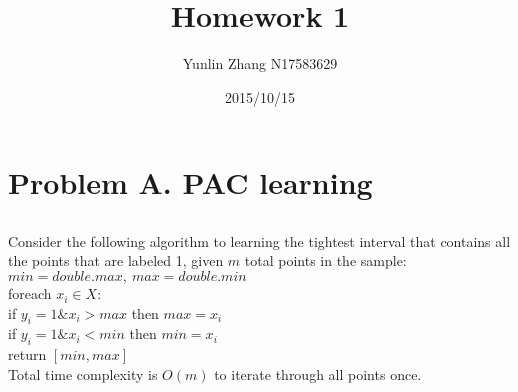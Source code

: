 \documentclass[11pt, oneside]{article}   	%
\title{Homework 1}
\author{Yunlin Zhang N17583629}
\date{2015/10/15}							%
\begin{document}
\maketitle
\section{Problem A. PAC learning}
\subsection{}
Consider the following algorithm to learning the tightest interval that contains all the points that are labeled 1, given $m$ total points in the sample:\\
\indent $min=double.max,\ max=double.min$\\
\indent foreach $x_i\in X$:\\
\indent\indent if $y_i = 1 \& x_i>max$ then $max=x_i$\\
\indent\indent if $y_i = 1 \& x_i<min$ then $min = x_i$\\
\indent return $[min,max]$\\

Total time complexity is $O(m)$ to iterate through all points once. \\
\end{document}
